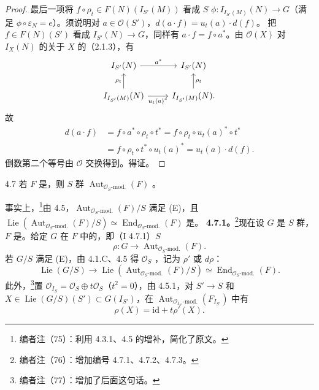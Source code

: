 \begin{proof}
最后一项将 $f\circ\rho_t\in F(N)(I_{S'}(M))$ 看成 $S$  $\phi:I_{I_{S'}(M)}(N)\to G$（满足 $\phi\circ\varepsilon_N=e$）。须说明对 $a\in\mathcal O(S')$，$d(a\cdot f)=u_t(a)\cdot d(f)$。
把 $f\in F(N)(S')$ 看成 $I_{S'}(N)\to G$，同样有 $a\cdot f=f\circ a^*$。由 $\mathcal O(X)$ 对 $I_X(N)$ 的关于 $X$ 的（2.1.3），有
\[\begin{tikzcd}
I_{S'}(N)\arrow[r,"a^*"]&I_{S'}(N)\\
I_{I_{S'}(M)}(N)\arrow[u,"\rho_t"]\arrow[r,"u_t(a)^*"']&I_{I_{S'}(M)}(N)\arrow[u,"\rho_t"'].
\end{tikzcd}\]
故
\[\begin{aligned}
d(a\cdot f)&=f\circ a^*\circ\rho_t\circ t^*=f\circ\rho_t\circ u_t(a)^*\circ t^*\\&=f\circ\rho_t\circ t^*\circ u_t(a)^*=u_t(a)\cdot d(f).
\end{aligned}\]
倒数第二个等号由 $\mathcal O$ 交换得到。得证。
\end{proof}
\begin{SGAresult}{}{4.7}
若 $F$ 是，则 $S$ 群 $\operatorname{Aut}_{\mathcal O_S\text{-mod.}}(F)$ 。
\end{SGAresult}
事实上，\footnote{编者注（75）：利用 4.3.1、4.5 的增补，简化了原文。}由 4.5，$\operatorname{Aut}_{\mathcal O_S\text{-mod.}}(F)/S$ 满足 (E)，且 $\operatorname{Lie}(\operatorname{Aut}_{\mathcal O_S\text{-mod.}}(F)/S)\simeq\operatorname{End}_{\mathcal O_S\text{-mod.}}(F)$ 是。
\textbf{4.7.1。}\footnote{编者注（76）：增加编号 4.7.1、4.7.2、4.7.3。}现在设 $G$ 是 $S$ 群，$F$ 是。给定 $G$ 在 $F$ 中的，即（I 4.7.1）$S$ 
\[\rho:G\to\operatorname{Aut}_{\mathcal O_S\text{-mod.}}(F).\]
若 $G/S$ 满足 (E)，由 4.1.C、4.5 得 $\mathcal O_S$ ，记为 $\rho'$ 或 $d\rho$：
\[\operatorname{Lie}(G/S)\to\operatorname{Lie}(\operatorname{Aut}_{\mathcal O_S\text{-mod.}}(F)/S)\simeq\operatorname{End}_{\mathcal O_S\text{-mod.}}(F).\]
此外，\footnote{编者注（77）：增加了后面这句话。}置 $\mathcal O_{I_S}=\mathcal O_S\oplus t\mathcal O_S$（$t^2=0$），由 4.5.1，对 $S'\to S$ 和 $X\in\operatorname{Lie}(G/S)(S')\subset G(I_{S'})$，在 $\operatorname{Aut}_{\mathcal O_{I_{S'}}\text{-mod.}}(F_{I_{S'}})$ 中有
\[\rho(X)=\mathrm{id}+t\rho'(X).\tag{*}\]
